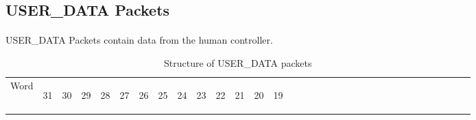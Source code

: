 \documentclass[11pt]{article}
\begin{document}
\subsection {USER\_DATA Packets}
\paragraph{}
USER\_DATA Packets contain data from the human controller.
\begin{table}[h!]
    \centering
    \caption{Structure of USER\_DATA packets}
    \label{tab:userDataDef}
    \begin{tabular}{|p{1cm}|p{0.04cm}|p{0.04cm}|m{0.04cm}|m{0.04cm}|m{0.04cm}|m{0.04cm}|m{0.04cm}|m{0.04cm}|m{0.04cm}|
        m{0.04cm}|m{0.04cm}|m{0.04cm}|m{0.04cm}|m{0.04cm}|m{0.04cm}|m{0.04cm}|m{0.04cm}|m{0.04cm}|m{0.04cm}|m{0.04cm}|
        m{0.04cm}|m{0.04cm}|m{0.04cm}|m{0.04cm}|m{0.04cm}|m{0.04cm}|m{0.04cm}|m{0.04cm}|m{0.04cm}|m{0.04cm}|m{0.04cm}|m{0.04cm}|}
        \hline
        Word & 
        \begin{sideways}31\end{sideways} &
        \begin{sideways}30\end{sideways} & 
        \begin{sideways}29\end{sideways} &
        \begin{sideways}28\end{sideways} &
        \begin{sideways}27\end{sideways} &
        \begin{sideways}26\end{sideways} &
        \begin{sideways}25\end{sideways} &
        \begin{sideways}24\end{sideways} &
        \begin{sideways}23\end{sideways} &
        \begin{sideways}22\end{sideways} &
        \begin{sideways}21\end{sideways} &
        \begin{sideways}20\end{sideways} &
        \begin{sideways}19\end{sideways} &

\end{tabular}
\end{table}
\end{document}
